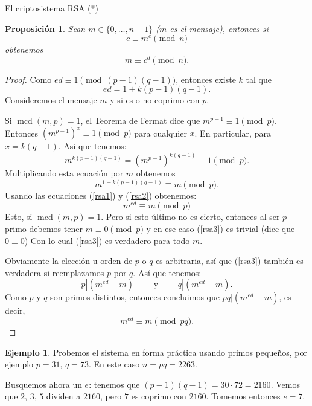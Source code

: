 \documentclass[11pt,spanish,makeidx]{amsbook}
\newtheorem{proposicion}[teorema]{Proposici\'on}
\theoremstyle{definition}
\newtheorem{ejemplo}{Ejemplo}[section]
\theoremstyle{remark}
\newcommand \mcd{\operatorname{mcd}}
\begin{document}
\begin{section}{El criptosistema RSA (*)}
\begin{proposicion}
	Sean $m \in \{0,\ldots,n-1\}$ ($m$  es el mensaje), entonces si 
	\begin{equation*}
		c \equiv m^e \pmod{n} 
	\end{equation*}
	obtenemos
	\begin{equation*}
		m \equiv c^d \pmod{n}.
	\end{equation*}

\end{proposicion} 
\begin{proof}
Como $ed \equiv 1 \pmod{(p - 1)(q - 1)}$, entonces existe $k$ tal que  
\begin{equation}\label{rsa1}
ed = 1 + k(p - 1)(q - 1).
\end{equation}
Consideremos el mensaje $m$ y si es o no coprimo con $p$.

Si $\mcd(m, p) = 1$, el Teorema de Fermat dice que $m^{p - 1}  \equiv 1\pmod{p}$.
Entonces $(m^{p - 1})^x \equiv 1\pmod{p}$ para cualquier $x$. En particular, para 
$x = k(q-1)$. Asi que tenemos:
\begin{equation*}
m^{k(p-1)(q-1)} = (m^{p-1})^{k(q-1)} \equiv 1\pmod{p}.
\end{equation*}
Multiplicando esta ecuación por $m$ obtenemos
\begin{equation}\label{rsa2}
m^{1+k(p-1)(q-1)} \equiv m\pmod{p}. 
\end{equation}
Usando las ecuaciones (\ref{rsa1}) y (\ref{rsa2}) obtenemos:
\begin{equation}\label{rsa3}
m^{ed} \equiv m\pmod{p} 
\end{equation}
Esto, si  $\mcd(m, p) = 1$. Pero si esto último no es cierto, entonces al ser $p$ primo debemos tener $m \equiv 0\pmod{p}$ y en ese caso (\ref{rsa3}) es trivial (dice que $0 \equiv 0$) Con lo cual (\ref{rsa3}) es verdadero para todo $m$.

Obviamente la elección u orden de $p$ o $q$ es arbitraria, así que (\ref{rsa3}) también es verdadera si reemplazamos $p$ por $q$. Así que tenemos: $$p|(m^{ed}-m) \qquad \text{ y } \qquad q|(m^{ed}-m).$$ Como $p$ y $q$ son primos distintos, entonces concluimos que $pq|(m^{ed}-m)$, es decir, $$m^{ed} \equiv m \pmod{pq}.$$
\end{proof}

\begin{ejemplo} Probemos el sistema en forma práctica usando primos pequeños, por ejemplo $p=31$, $q=73$. En este caso $n = pq = 2263$. 

Busquemos ahora un $e$:  tenemos que $ (p-1)(q-1)= 30\cdot 72 = 2160$. Vemos que $2$, $3$, $5$ dividen a $2160$, pero $7$ es coprimo con $2160$. Tomemos entonces $e = 7$.


\end{ejemplo}
\end{section}
\end{document}
